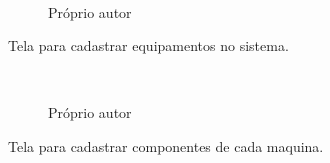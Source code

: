 \begin{figure}[H]
		\caption{\label{step_3}Próprio autor}
	\centering
	\mbox{%
		\qquad
	}
	
\end{figure}
\newpage

Tela para cadastrar equipamentos no sistema.

\begin{figure}[H]
		\caption{\label{Cadastro_Equipamento_Sistema}Próprio autor}
	\centering
	\mbox{%
		\qquad
	}
	
\end{figure}
\newpage

Tela para cadastrar componentes de cada maquina.

